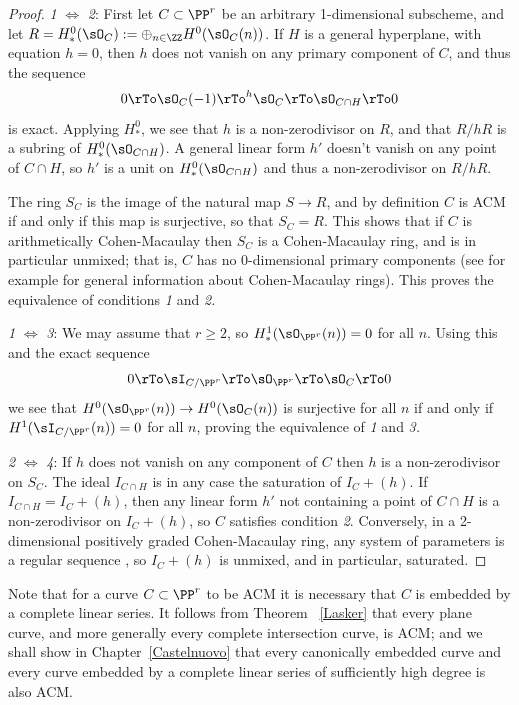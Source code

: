\begin{proof}
{\sl 1} $\Leftrightarrow$ {\sl 2}: First let $C\subset \PP^r$ be an arbitrary 1-dimensional subscheme,
and let $R =H^0_*(\sO_{C}) := \oplus_{n\in \ZZ} H^0(\sO_{C}(n))$.
If $H$ is a 
general hyperplane, with equation $h=0$, then $h$ does not vanish on any primary component of $C$, and thus the sequence
$$
0\rTo \sO_C(-1) \rTo^{h}\sO_C\rTo \sO_{C\cap H}\rTo 0
$$
is exact. Applying $H^0_*$, we see that $h$ is a non-zerodivisor on $R$, and that $R/hR$ is
a subring of $H^0_*(\sO_{C\cap H})$.  A general linear form $h'$ doesn't vanish on
any point of $C\cap H$, so $h'$ is a unit on $H^0_*(\sO_{C\cap H})$
and thus a non-zerodivisor on $R/hR$. 

The ring $S_C$ is the image of the natural map $S\to R$, and by definition $C$ is ACM if and only if this map is surjective,
so that $S_C = R.$ This shows that if $C$ is arithmetically Cohen-Macaulay then $S_C$ is a Cohen-Macaulay ring,
and is in particular unmixed; that is, $C$ has no 0-dimensional primary components (see for example \cite[Chapter 18]{Eisenbud1995} for general
information about Cohen-Macaulay rings). This proves the equivalence of conditions {\sl 1} and {\sl 2.}

{\sl 1} $\Leftrightarrow$ {\sl 3}: We may assume that $r\geq 2$, so $H^1_*(\sO_{\PP^r}(n)) = 0$ for all $n$. Using this and the exact sequence 
$$
0\rTo \sI_{C/\PP^r}  \rTo  \sO_{\PP^r}  \rTo  \sO_C  \rTo  0
$$
we see that $H^0(\sO_{\PP^r}(n)) \to H^0(\sO_C(n))$ is surjective for all $n$ if and only if $H^1(\sI_{C/\PP^r}(n)) = 0$ for all $n$,
proving the equivalence of {\sl 1} and {\sl 3.}

{\sl 2} $\Leftrightarrow$ {\sl 4}: If  $h$ does not vanish on any component of $C$ then $h$ is a non-zerodivisor on $S_C$. The ideal $I_{C\cap H}$ is in any case the saturation of $I_C+(h)$. 
If $I_{C\cap H}=I_C+(h)$, then any linear form $h'$ not containing a point of $C\cap H$ is a non-zerodivisor
on $I_C+(h)$, so $C$ satisfies condition {\sl 2}. Conversely, in a 2-dimensional positively graded Cohen-Macaulay ring, any 
system of parameters is a regular sequence \cite[Section 18.2]{Eisenbud1995}, so $I_C+(h)$ is unmixed, and in particular, saturated.
\end{proof}
Note that for a curve $C\subset \PP^r$ to be ACM it is necessary that $C$ is embedded by a complete linear
series.
It follows from Theorem ~\ref{Lasker} that every plane curve, and more generally every complete intersection curve,
is ACM; and we shall show in Chapter~\ref{Castelnuovo} that every canonically embedded curve
and every curve embedded by a complete linear series of sufficiently high degree is also ACM.



